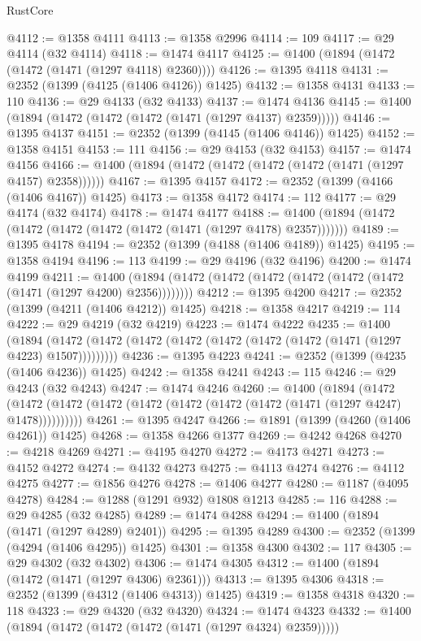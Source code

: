\begin{lexlean}{RustCore}
\begin{coremodule}
{\begin{coremodule}
{{{{{{{{{{{{{{{{{{{{{{{{{{{{{{{{{{{{{{{{{{{{@4112 := @1358 @4111
@4113 := @1358 @2996
@4114 := 109
@4117 := @29 @4114 (@32 @4114)
@4118 := @1474 @4117
@4125 := @1400 (@1894 (@1472 (@1472 (@1471 (@1297 @4118) @2360))))
@4126 := @1395 @4118
@4131 := @2352 (@1399 (@4125 (@1406 @4126)) @1425)
@4132 := @1358 @4131
@4133 := 110
@4136 := @29 @4133 (@32 @4133)
@4137 := @1474 @4136
@4145 := @1400 (@1894 (@1472 (@1472 (@1472 (@1471 (@1297 @4137) @2359)))))
@4146 := @1395 @4137
@4151 := @2352 (@1399 (@4145 (@1406 @4146)) @1425)
@4152 := @1358 @4151
@4153 := 111
@4156 := @29 @4153 (@32 @4153)
@4157 := @1474 @4156
@4166 := @1400 (@1894 (@1472 (@1472 (@1472 (@1472 (@1471 (@1297 @4157) @2358))))))
@4167 := @1395 @4157
@4172 := @2352 (@1399 (@4166 (@1406 @4167)) @1425)
@4173 := @1358 @4172
@4174 := 112
@4177 := @29 @4174 (@32 @4174)
@4178 := @1474 @4177
@4188 := @1400 (@1894 (@1472 (@1472 (@1472 (@1472 (@1472 (@1471 (@1297 @4178) @2357)))))))
@4189 := @1395 @4178
@4194 := @2352 (@1399 (@4188 (@1406 @4189)) @1425)
@4195 := @1358 @4194
@4196 := 113
@4199 := @29 @4196 (@32 @4196)
@4200 := @1474 @4199
@4211 := @1400 (@1894 (@1472 (@1472 (@1472 (@1472 (@1472 (@1472 (@1471 (@1297 @4200) @2356))))))))
@4212 := @1395 @4200
@4217 := @2352 (@1399 (@4211 (@1406 @4212)) @1425)
@4218 := @1358 @4217
@4219 := 114
@4222 := @29 @4219 (@32 @4219)
@4223 := @1474 @4222
@4235 := @1400
    (@1894 (@1472 (@1472 (@1472 (@1472 (@1472 (@1472 (@1472 (@1471 (@1297 @4223) @1507)))))))))
@4236 := @1395 @4223
@4241 := @2352 (@1399 (@4235 (@1406 @4236)) @1425)
@4242 := @1358 @4241
@4243 := 115
@4246 := @29 @4243 (@32 @4243)
@4247 := @1474 @4246
@4260 := @1400
    (@1894
      (@1472 (@1472 (@1472 (@1472 (@1472 (@1472 (@1472 (@1472 (@1471 (@1297 @4247) @1478))))))))))
@4261 := @1395 @4247
@4266 := @1891 (@1399 (@4260 (@1406 @4261)) @1425)
@4268 := @1358 @4266 @1377
@4269 := @4242 @4268
@4270 := @4218 @4269
@4271 := @4195 @4270
@4272 := @4173 @4271
@4273 := @4152 @4272
@4274 := @4132 @4273
@4275 := @4113 @4274
@4276 := @4112 @4275
@4277 := @1856 @4276
@4278 := @1406 @4277
@4280 := @1187 (@4095 @4278)
@4284 := @1288 (@1291 @932) @1808 @1213
@4285 := 116
@4288 := @29 @4285 (@32 @4285)
@4289 := @1474 @4288
@4294 := @1400 (@1894 (@1471 (@1297 @4289) @2401))
@4295 := @1395 @4289
@4300 := @2352 (@1399 (@4294 (@1406 @4295)) @1425)
@4301 := @1358 @4300
@4302 := 117
@4305 := @29 @4302 (@32 @4302)
@4306 := @1474 @4305
@4312 := @1400 (@1894 (@1472 (@1471 (@1297 @4306) @2361)))
@4313 := @1395 @4306
@4318 := @2352 (@1399 (@4312 (@1406 @4313)) @1425)
@4319 := @1358 @4318
@4320 := 118
@4323 := @29 @4320 (@32 @4320)
@4324 := @1474 @4323
@4332 := @1400 (@1894 (@1472 (@1472 (@1472 (@1471 (@1297 @4324) @2359)))))
}}}}}}}}}}}}}}}}}}}}}}}}}}}}}}}}}}}}}}}}}}}}
\end{coremodule}}
\end{coremodule}
\end{lexlean}
